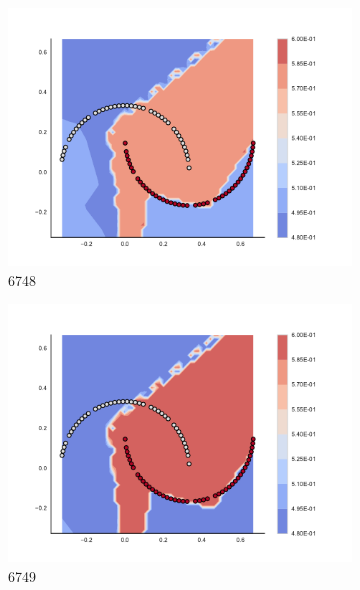 \begin{figure}[h]
\begin{subfigure}[b]{0.09\textwidth}
    \includegraphics[clip, trim=2.35cm 1.75cm 4.5cm 0cm,width=\textwidth]{img/convergence/6748.pdf}
    \caption{6748}
    \label{fig:convergence_6748}
\end{subfigure}
%
\begin{subfigure}[b]{0.09\textwidth}
    \includegraphics[clip, trim=2.35cm 1.75cm 4.5cm 0cm,width=\textwidth]{img/convergence/6749.pdf}
    \caption{6749}
    \label{fig:convergence_6749}
\end{subfigure}
%
\begin{subfigure}[b]{0.09\textwidth}

\end{subfigure}
\end{figure}
